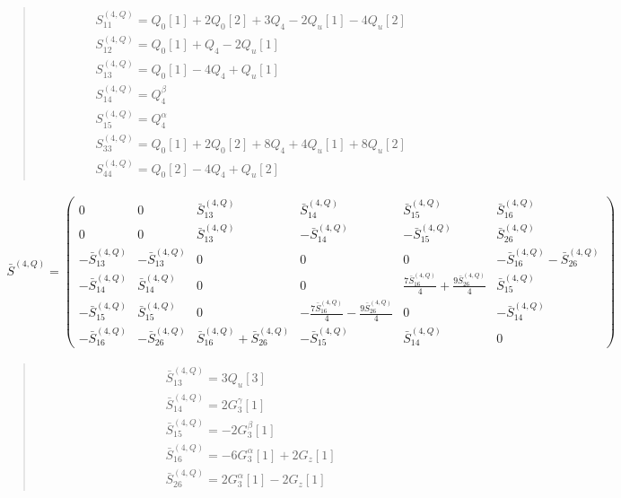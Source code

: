 \documentclass[fleqn,10pt]{jsarticle}
\begin{document}
\begin{quote}
\begin{align*}
& S^{(4,Q)}_{11} = Q_{0}[1] + 2 Q_{0}[2] + 3 Q_{4} - 2 Q_{u}[1] - 4 Q_{u}[2] \\
& S^{(4,Q)}_{12} = Q_{0}[1] + Q_{4} - 2 Q_{u}[1] \\
& S^{(4,Q)}_{13} = Q_{0}[1] - 4 Q_{4} + Q_{u}[1] \\
& S^{(4,Q)}_{14} = Q_{4}^{\beta} \\
& S^{(4,Q)}_{15} = Q_{4}^{\alpha} \\
& S^{(4,Q)}_{33} = Q_{0}[1] + 2 Q_{0}[2] + 8 Q_{4} + 4 Q_{u}[1] + 8 Q_{u}[2] \\
& S^{(4,Q)}_{44} = Q_{0}[2] - 4 Q_{4} + Q_{u}[2]
\end{align*}
\end{quote}
\begin{align*}
\bar{S}^{(4,Q)} = \begin{pmatrix} 0 & 0 & \bar{S}^{(4,Q)}_{13} & \bar{S}^{(4,Q)}_{14} & \bar{S}^{(4,Q)}_{15} & \bar{S}^{(4,Q)}_{16} \\ 0 & 0 & \bar{S}^{(4,Q)}_{13} & - \bar{S}^{(4,Q)}_{14} & - \bar{S}^{(4,Q)}_{15} & \bar{S}^{(4,Q)}_{26} \\ - \bar{S}^{(4,Q)}_{13} & - \bar{S}^{(4,Q)}_{13} & 0 & 0 & 0 & - \bar{S}^{(4,Q)}_{16} - \bar{S}^{(4,Q)}_{26} \\ - \bar{S}^{(4,Q)}_{14} & \bar{S}^{(4,Q)}_{14} & 0 & 0 & \frac{7 \bar{S}^{(4,Q)}_{16}}{4} + \frac{9 \bar{S}^{(4,Q)}_{26}}{4} & \bar{S}^{(4,Q)}_{15} \\ - \bar{S}^{(4,Q)}_{15} & \bar{S}^{(4,Q)}_{15} & 0 & - \frac{7 \bar{S}^{(4,Q)}_{16}}{4} - \frac{9 \bar{S}^{(4,Q)}_{26}}{4} & 0 & - \bar{S}^{(4,Q)}_{14} \\ - \bar{S}^{(4,Q)}_{16} & - \bar{S}^{(4,Q)}_{26} & \bar{S}^{(4,Q)}_{16} + \bar{S}^{(4,Q)}_{26} & - \bar{S}^{(4,Q)}_{15} & \bar{S}^{(4,Q)}_{14} & 0 \end{pmatrix}
\end{align*}
\begin{quote}
\begin{align*}
& \bar{S}^{(4,Q)}_{13} = 3 Q_{u}[3] \\
& \bar{S}^{(4,Q)}_{14} = 2 G_{3}^{\gamma}[1] \\
& \bar{S}^{(4,Q)}_{15} = - 2 G_{3}^{\beta}[1] \\
& \bar{S}^{(4,Q)}_{16} = - 6 G_{3}^{\alpha}[1] + 2 G_{z}[1] \\
& \bar{S}^{(4,Q)}_{26} = 2 G_{3}^{\alpha}[1] - 2 G_{z}[1]
\end{align*}
\end{quote}
\end{document}
